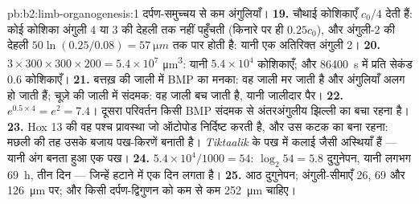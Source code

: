 \begin{solution}{pb:b2:limb-organogenesis:1}
दर्पण-समुच्चय से कम अंगुलियाँ।
\textbf{19.} चौथाई कोशिकाएँ $c_0/4$ देती हैं: कोई कोशिका
अंगुली 4 या 3 की देहली तक नहीं पहुँचती (किनारे पर ही $0.25 c_0$), और
अंगुली-2 की देहली $50\ln(0.25/0.08) =
\qty{57}{\micro m}$ तक पार होती है: यानी एक अतिरिक्त अंगुली 2।
\textbf{20.} $3\times 300\times 300\times 200 = 5.4\times 10^{7}$
\unit{\micro m^3}: यानी $5.4\times 10^{4}$ कोशिकाएँ; और \qty{86400}{s} में
प्रति सेकंड $0.6$ कोशिकाएँ।
\textbf{21.} बत्तख़ की जाली में BMP का मनका: वह जाली मर जाती है और
अंगुलियाँ अलग हो जाती हैं; चूज़े की जाली में संदमक: वह जाली बच जाती है, यानी जालीदार
पैर।
\textbf{22.} $e^{0.5\times 4} = e^{2} = 7.4$। दूसरा परिवर्तन
किसी BMP संदमक से अंतरअंगुलीय झिल्ली का बचा रहना है।
\textbf{23.} Hox 13 की वह पश्च प्रावस्था जो ऑटोपोड निर्दिष्ट करती है,
और उस कटक का बना रहना: मछली की तह उसके बजाय पख-किरणें
बनाती है। \emph{Tiktaalik} के पख में कलाई जैसी अस्थियाँ हैं --- यानी
अंग बनता हुआ एक पख।
\textbf{24.} $5.4\times 10^{4}/1000 = 54$: $\log_2 54 = 5.8$ दुगुनेपन,
यानी लगभग \qty{69}{h}, तीन दिन --- जिन्हें हटाने में एक दिन लगता है।
\textbf{25.} आठ दुगुनेपन; अंगुली-सीमाएँ 26, 69 और
\qty{126}{\micro m} पर; और किसी दर्पण-द्विगुणन को कम से कम
\qty{252}{\micro m} चाहिए।
\end{solution}
